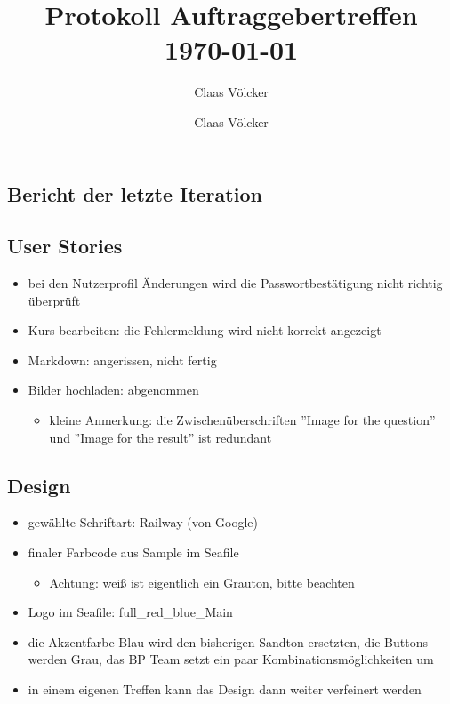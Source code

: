 \documentclass[colorback, accentcolor=tud1c, paper=a4]{tudexercise}
\title{Protokoll Auftraggebertreffen \today}
\subtitle{Claas Völcker}
\author{Claas Völcker}
\begin{document}
\maketitle

\begin{multicols}{2}

\section*{Bericht der letzte Iteration}
\subsection*{User Stories}
\begin{itemize}
	\item bei den Nutzerprofil Änderungen wird die Passwortbestätigung nicht richtig überprüft
	\item Kurs bearbeiten: die Fehlermeldung wird nicht korrekt angezeigt
	\item Markdown: angerissen, nicht fertig
	\item Bilder hochladen: abgenommen
	\begin{itemize}
		\item kleine Anmerkung: die Zwischenüberschriften ''Image for the question'' und ''Image for the result'' ist redundant
	\end{itemize}
\end{itemize}

\subsection*{Design}
\begin{itemize}
	\item gewählte Schriftart: Railway (von Google)
	\item finaler Farbcode aus Sample im Seafile
	\begin{itemize}
		\item Achtung: weiß ist eigentlich ein Grauton, bitte beachten
	\end{itemize}
	\item Logo im Seafile: full\_red\_blue\_Main
	\item die Akzentfarbe Blau wird den bisherigen Sandton ersetzten, die Buttons werden Grau, das BP Team setzt ein paar Kombinationsmöglichkeiten um
	\item in einem eigenen Treffen kann das Design dann weiter verfeinert werden
\end{itemize}


\end{multicols}
\end{document}
